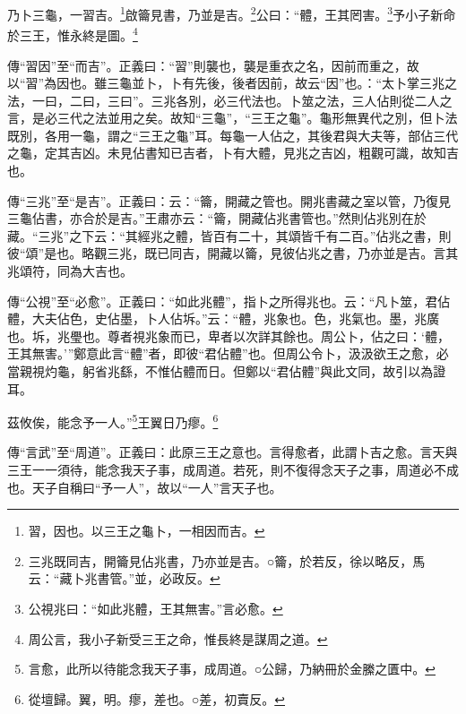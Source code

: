 乃卜三龜，一習吉。\footnote{習，因也。以三王之龜卜，一相因而吉。}啟籥見書，乃並是吉。\footnote{三兆既同吉，開籥見佔兆書，乃亦並是吉。○籥，於若反，徐以略反，馬云：“藏卜兆書管。”並，必政反。}公曰：“體，王其罔害。\footnote{公視兆曰：“如此兆體，王其無害。”言必愈。}予小子新命於三王，惟永終是圖。\footnote{周公言，我小子新受三王之命，惟長終是謀周之道。}


{\noindent\zhuan{}\fzbyks 傳“習因”至“而吉”。正義曰：“習”則襲也，襲是重衣之名，因前而重之，故以“習”為因也。雖三龜並卜，卜有先後，後者因前，故云“因”也。：“太卜掌三兆之法，一曰，二曰，三曰”。三兆各別，必三代法也。卜筮之法，三人佔則從二人之言，是必三代之法並用之矣。故知“三龜”，“三王之龜”。龜形無異代之別，但卜法既別，各用一龜，謂之“三王之龜”耳。每龜一人佔之，其後君與大夫等，部佔三代之龜，定其吉凶。未見佔書知已吉者，卜有大體，見兆之吉凶，粗觀可識，故知吉也。 \par}

{\noindent\zhuan{}\fzbyks 傳“三兆”至“是吉”。正義曰：云：“籥，開藏之管也。開兆書藏之室以管，乃復見三龜佔書，亦合於是吉。”王肅亦云：“籥，開藏佔兆書管也。”然則佔兆別在於藏。“三兆”之下云：“其經兆之體，皆百有二十，其頌皆千有二百。”佔兆之書，則彼“頌”是也。略觀三兆，既已同吉，開藏以籥，見彼佔兆之書，乃亦並是吉。言其兆頌符，同為大吉也。 \par}

{\noindent\zhuan{}\fzbyks 傳“公視”至“必愈”。正義曰：“如此兆體”，指卜之所得兆也。云：“凡卜筮，君佔體，大夫佔色，史佔墨，卜人佔坼。”云：“體，兆象也。色，兆氣也。墨，兆廣也。坼，兆璺也。尊者視兆象而已，卑者以次詳其餘也。周公卜，佔之曰：‘體，王其無害。’”鄭意此言“體”者，即彼“君佔體”也。但周公令卜，汲汲欲王之愈，必當親視灼龜，躬省兆繇，不惟佔體而日。但鄭以“君佔體”與此文同，故引以為證耳。 \par}

茲攸俟，能念予一人。”\footnote{言愈，此所以待能念我天子事，成周道。○公歸，乃納冊於金縢之匱中。}王翼日乃瘳。\footnote{從壇歸。翼，明。瘳，差也。○差，初賣反。}

{\noindent\zhuan{}\fzbyks 傳“言武”至“周道”。正義曰：此原三王之意也。言得愈者，此謂卜吉之愈。言天與三王一一須待，能念我天子事，成周道。若死，則不復得念天子之事，周道必不成也。天子自稱曰“予一人”，故以“一人”言天子也。 \par}

